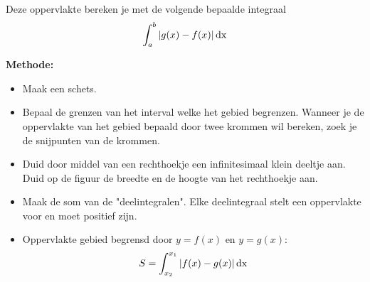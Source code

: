 \begin{center}
	
\end{center}

Deze oppervlakte bereken je met de volgende bepaalde integraal
\begin{equation*}
\int_{a}^{b} | g(x)-f(x)| \operatorname{dx}
\end{equation*}


\textbf{Methode:}

\begin{itemize}
	\item Maak een schets.
	\item Bepaal de grenzen van het interval welke het gebied begrenzen. Wanneer je de oppervlakte van het gebied bepaald door twee krommen wil bereken, zoek je de snijpunten van de krommen.
	\item Duid door middel van een rechthoekje een infinitesimaal klein deeltje aan. Duid op de figuur de breedte en de hoogte van het rechthoekje aan.
	\item Maak de som van de "deelintegralen". Elke deelintegraal stelt een oppervlakte voor en moet positief zijn.
	\item Oppervlakte gebied begrensd door $y=f(x)$ en  $y=g(x)$:
	\begin{equation*}
	S=\int_{x_2}^{x_1} |f(x)-g(x)| \operatorname{dx}
	\end{equation*}
\end{itemize}



